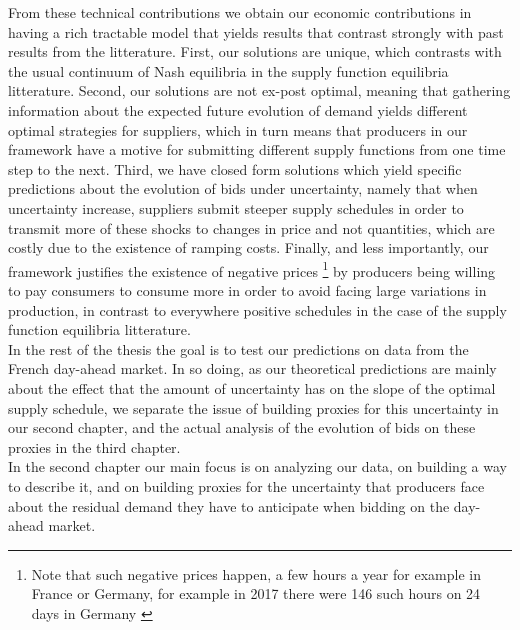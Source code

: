 From these technical contributions we obtain our economic contributions in having a rich tractable model that yields results that contrast strongly with past results from the litterature. First, our solutions are unique, which contrasts with the usual continuum of Nash equilibria in the supply function equilibria litterature. Second, our solutions are not ex-post optimal, meaning that gathering information about the expected future evolution of demand yields different optimal strategies for suppliers, which in turn means that producers in our framework have a motive for submitting different supply functions from one time step to the next. Third, we have closed form solutions which yield specific predictions about the evolution of bids under uncertainty, namely that when uncertainty increase, suppliers submit steeper supply schedules in order to transmit more of these shocks to changes in price and not quantities, which are costly due to the existence of ramping costs. Finally, and less importantly, our framework justifies the existence of negative prices \footnote{Note that such negative prices happen, a few hours a year for example in France or Germany,  for example in 2017 there were 146 such hours on 24 days in Germany \cite{epexnegP}} by producers being willing to pay consumers to consume more in order to avoid facing large variations in production, in contrast to everywhere positive schedules in the case of the supply function equilibria litterature.\\

In the rest of the thesis the goal is to test our predictions on data from the French day-ahead market. In so doing, as our theoretical predictions are mainly about the effect that the amount of uncertainty has on the slope of the optimal supply schedule, we separate the issue of building proxies for this uncertainty in our second chapter, and the actual analysis of the evolution of bids on these proxies in the third chapter.\\

In the second chapter our main focus is on analyzing our data, on building a way to describe it, and on building proxies for the uncertainty that producers face about the residual demand they have to anticipate when bidding on the day-ahead market. \\

